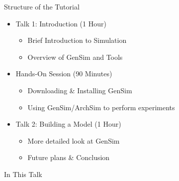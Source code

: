 \begin{frame}{Structure of the Tutorial}

\begin{itemize}
\item Talk 1: Introduction (1 Hour)
\begin{itemize}
	\item Brief Introduction to Simulation
	\item Overview of GenSim and Tools
\end{itemize}

\item Hands-On Session (90 Minutes)
\begin{itemize}
	\item Downloading \& Installing GenSim
	\item Using GenSim/ArchSim to perform experiments
\end{itemize}

\item Talk 2: Building a Model (1 Hour)
\begin{itemize}
	\item More detailed look at GenSim
	\item Future plans \& Conclusion
\end{itemize}

\end{itemize}

\end{frame}

\begin{frame}{In This Talk}
	\tableofcontents
\end{frame}	
